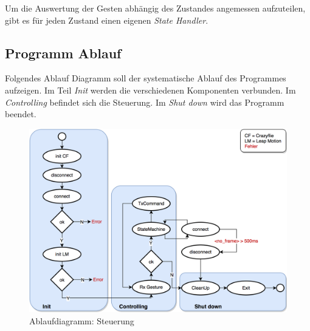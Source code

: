 Um die Auswertung der Gesten abhängig des Zustandes angemessen aufzuteilen, gibt es für jeden Zustand einen eigenen \textit{State Handler}.

\newpage
\subsection{Programm Ablauf}
Folgendes Ablauf Diagramm soll der systematische Ablauf des Programmes aufzeigen.
Im Teil \textit{Init} werden die verschiedenen Komponenten verbunden.
Im \textit{Controlling} befindet sich die Steuerung.
Im \textit{Shut down} wird das Programm beendet.
\begin{figure}[H]
	\centering
	\includegraphics[width=1.0\textwidth]{figures/poc/flowchart_controll.png}
	\caption{Ablaufdiagramm: Steuerung}
\end{figure}


\newpage
